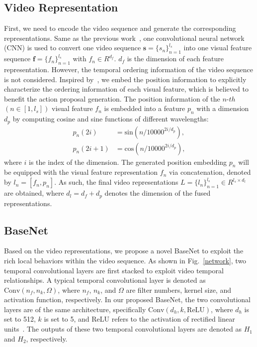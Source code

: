 \documentclass[10pt,twocolumn,letterpaper]{article}
\begin{document}
\subsection{Video Representation} 
First, we need to encode the video sequence and generate the corresponding representations. Same as the previous work~\cite{bsn,ctap}, one convolutional neural network (CNN) is used to convert one video sequence $\textbf{s}=\{s_n\}^{l_s}_{n=1}$ into one visual feature sequence $\textbf{f}=\{f_n\}^{l_s}_{n=1}$ with $f_n \in R^{d_f}$. $d_f$ is the dimension of each feature representation. However, the temporal ordering information of the video sequence is not considered. Inspired by~\cite{attention_is,conv_seq2seq}, we embed the position information to explicitly characterize the ordering information of each visual feature, which is believed to benefit the action proposal generation. {The position information of the $n$-$th$ $(n\in[1,l_{s}])$ visual feature $f_n$ is embedded into a feature $p_{n}$ with a dimension $d_p$ by computing cosine and sine functions of different wavelengths:
\begin{equation}
\begin{split}
    p_n(2i) &= \text{sin}(n/10000^{2i/d_p}),\\
    p_n(2i+1) &= \text{cos}(n/10000^{2i/d_p}),
\end{split}
\end{equation}
where $i$ is the index of the dimension. The generated position embedding $p_n$ will be equipped with the visual feature representation $f_{n}$ via concatenation, denoted by $l_{n} = [f_{n},p_{n}]$. As such, the final video representations $L = \{l_{n}\}_{n=1}^{l_{s}} \in R^{l_{s}\times d_{l}}$ are obtained, where $d_{l} = d_{f}+d_p$ denotes the dimension of the fused representations.}


\subsection{BaseNet}
Based on the video representations, we propose a novel BaseNet to exploit the rich local behaviors within the video sequence. As shown in Fig.~\ref{network}, two temporal convolutional layers are first stacked to exploit video temporal relationships. A typical temporal convolutional layer is denoted as $\text{Conv}(n_f,n_k,\Omega )$, where $n_f$, $n_k$, and $\Omega $ are filter numbers, kernel size, and activation function, respectively. In our proposed BaseNet, the two convolutional layers are of the same architecture, specifically $\text{Conv}(d_h,k,\text{ReLU})$, where $d_h$ is set to 512, $k$ is set to 5, and ReLU refers to the activation of rectified linear units~\cite{relu}. The outputs of these two temporal convolutional layers are denoted as  $H_1$ and $H_2$, respectively. 
\end{document}
